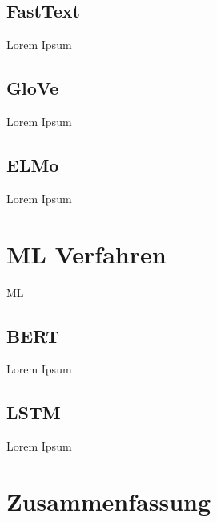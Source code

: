
\subsection{FastText}

Lorem Ipsum

\subsection{GloVe}


Lorem Ipsum

\subsection{ELMo}

Lorem Ipsum

\section{\acl{ML} Verfahren}

\ac{ML}


\subsection{BERT}

Lorem Ipsum

\subsection{LSTM}

Lorem Ipsum

\section{Zusammenfassung}
